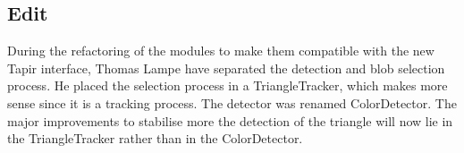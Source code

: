 \subsection{Edit}
\label{sec:ocd:edit}

During the refactoring of the modules to make them compatible with the 
new Tapir interface, Thomas Lampe have separated the detection and blob 
selection process. He placed the selection process in a TriangleTracker, 
which makes more sense since it is a tracking process. The detector was 
renamed ColorDetector. The major improvements to stabilise more the 
detection of the triangle will now lie in the TriangleTracker rather 
than in the ColorDetector.
